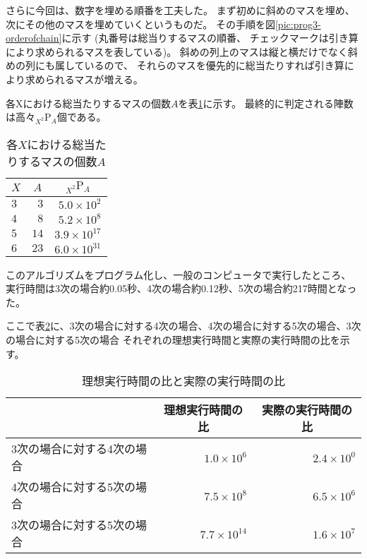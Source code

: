さらに今回は、数字を埋める順番を工夫した。
まず初めに斜めのマスを埋め、次にその他のマスを埋めていくというものだ。
その手順を図\ref{pic:prog3-orderofchain}に示す
(丸番号は総当りするマスの順番、
チェックマークは引き算により求められるマスを表している)。
斜めの列上のマスは縦と横だけでなく斜めの列にも属しているので、
それらのマスを優先的に総当たりすれば引き算により求められるマスが増える。

各Xにおける総当たりするマスの個数$A$を表\ref{tab:chaincount-each-X}に示す。
最終的に判定される陣数は高々$_{X^2} \mathrm{P} _A$個である。

\begin{table}[htb]
	\begin{center}
	\begin{tabular}{|l|r|r|}
\hline \hline
\multicolumn{1}{|c|}{$X$} & \multicolumn{1}{|c|}{$A$} & \multicolumn{1}{|c|}{$_{X^2} \mathrm{P} _A$} \\
\hline \hline
$3$ & $3$ & $5.0 \times 10^2$ \\
$4$ & $8$ & $5.2 \times 10^8$ \\
$5$ & $14$ & $3.9 \times 10^{17}$ \\
$6$ & $23$ & $6.0 \times 10^{31}$ \\
\hline
	\end{tabular}
	\end{center}
	\caption{各$X$における総当たりするマスの個数$A$}
	\label{tab:chaincount-each-X}
\end{table}

このアルゴリズムをプログラム化し、一般のコンピュータで実行したところ、
実行時間は3次の場合約0.05秒、4次の場合約0.12秒、5次の場合約217時間となった。

ここで表\ref{tab:bohemian-rhapsody}に、3次の場合に対する4次の場合、4次の場合に対する5次の場合、3次の場合に対する5次の場合
それぞれの理想実行時間と実際の実行時間の比を示す。

\begin{table}[htb]
	\begin{center}
	\begin{tabular}{|l||r|r|}
\hline
& \multicolumn{1}{|c|}{理想実行時間の比} & \multicolumn{1}{|c|}{実際の実行時間の比} \\
\hline\hline
3次の場合に対する4次の場合 & $1.0 \times 10^6$  & $2.4 \times 10^0$ \\\hline
4次の場合に対する5次の場合 & $7.5 \times 10^8$  & $6.5 \times 10^6$ \\\hline
3次の場合に対する5次の場合 & $7.7 \times 10^{14}$  & $1.6 \times 10^7$ \\\hline
	\end{tabular}
	\end{center}
	\caption{理想実行時間の比と実際の実行時間の比}
	\label{tab:bohemian-rhapsody}
\end{table}


